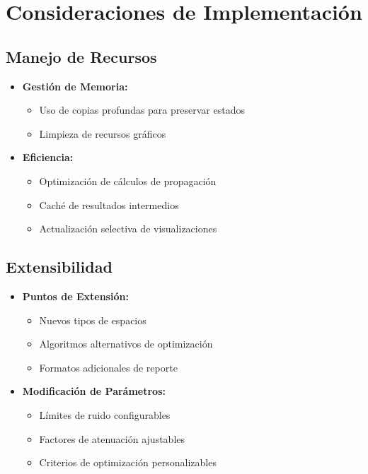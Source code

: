 \documentclass[a4paper,12pt]{article}
\begin{document}
\section{Consideraciones de Implementación}
\subsection{Manejo de Recursos}
\begin{itemize}
    \item \textbf{Gestión de Memoria:}
    \begin{itemize}
        \item Uso de copias profundas para preservar estados
        \item Limpieza de recursos gráficos
    \end{itemize}
    
    \item \textbf{Eficiencia:}
    \begin{itemize}
        \item Optimización de cálculos de propagación
        \item Caché de resultados intermedios
        \item Actualización selectiva de visualizaciones
    \end{itemize}
\end{itemize}

\subsection{Extensibilidad}
\begin{itemize}
    \item \textbf{Puntos de Extensión:}
    \begin{itemize}
        \item Nuevos tipos de espacios
        \item Algoritmos alternativos de optimización
        \item Formatos adicionales de reporte
    \end{itemize}
    
    \item \textbf{Modificación de Parámetros:}
    \begin{itemize}
        \item Límites de ruido configurables
        \item Factores de atenuación ajustables
        \item Criterios de optimización personalizables
    \end{itemize}
\end{itemize}
\end{document}

